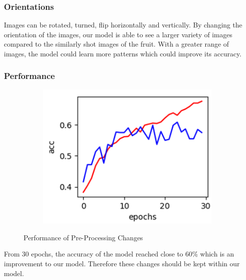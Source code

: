 




\subsubsection{Orientations}
Images can be rotated, turned, flip horizontally and vertically. By changing the orientation of the images, our model is able to see a larger variety of images compared to the similarly shot images of the fruit. With a greater range of images, the model could learn more patterns which could improve its accuracy. 

\subsubsection{Performance}

\begin{figure}[h!]
  \centering
  \begin{subfigure}[b]{0.35\linewidth}
    \includegraphics[width=\linewidth]{pre-processing-performance.png}
  \end{subfigure}
  \caption{Performance of Pre-Processing Changes}
  \label{fig:pre-processing-performance}
\end{figure}

From 30 epochs, the accuracy of the model reached close to 60\% which is an improvement to our model. Therefore these changes should be kept within our model. 
